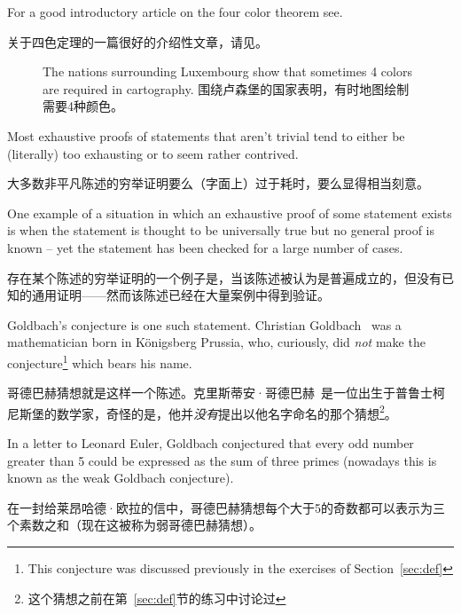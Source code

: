 For a  good introductory article on
the four color theorem see\cite{wiki-4color}.

关于四色定理的一篇很好的介绍性文章，请见\cite{wiki-4color}。

\begin{figure}[!hbtp] 
\begin{center}

\end{center}
\caption[A four-color map.]{The nations surrounding %
 Luxembourg show %
that sometimes 4 colors are required in cartography. 围绕卢森堡的国家表明，有时地图绘制需要4种颜色。}
\label{fig:Lux_map}
\end{figure}

Most exhaustive proofs of statements that aren't trivial tend to either be (literally) too exhausting or to seem rather contrived.

大多数非平凡陈述的穷举证明要么（字面上）过于耗时，要么显得相当刻意。

One example of a situation
in which an exhaustive proof of some statement exists is when the statement
is thought to be universally true but no general proof is known -- yet the
statement has been checked for a large number of cases.

存在某个陈述的穷举证明的一个例子是，当该陈述被认为是普遍成立的，但没有已知的通用证明——然而该陈述已经在大量案例中得到验证。

Goldbach's conjecture
is one such statement.  
Christian Goldbach~\cite{wiki-goldbach} 
was a mathematician born
in K\"{o}nigsberg Prussia, 
who, curiously, did \emph{not} make the
conjecture\footnote{This conjecture was %
discussed previously in the exercises of Section~\ref{sec:def}} which bears
his name.

哥德巴赫猜想就是这样一个陈述。克里斯蒂安·哥德巴赫~\cite{wiki-goldbach}是一位出生于普鲁士柯尼斯堡的数学家，奇怪的是，他并\emph{没有}提出以他名字命名的那个猜想\footnote{这个猜想之前在第~\ref{sec:def}节的练习中讨论过}。

In a letter to 
Leonard Euler, Goldbach conjectured that every
odd number greater than 5 could be expressed as the sum of three primes (nowadays this is known as the 
 weak Goldbach conjecture).

在一封给莱昂哈德·欧拉的信中，哥德巴赫猜想每个大于5的奇数都可以表示为三个素数之和（现在这被称为弱哥德巴赫猜想）。

